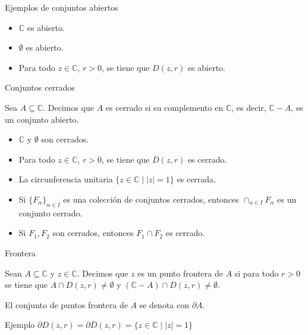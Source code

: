 \documentclass[spanish,presentation]{beamer}
\begin{document}
\begin{frame}[label=sec-1-3]{Ejemplos de conjuntos abiertos}
\begin{exampleblock}{}
\begin{itemize}
\item \(\mathbb{C}\) es abierto.
\item \(\emptyset\) es abierto.
\item Para todo \(z\in \mathbb{C}\), \(r>0\), se tiene que \(D(z,r)\)
      es abierto.
\end{itemize}
\end{exampleblock}
\end{frame}

\begin{frame}[label=sec-1-4]{Conjuntos cerrados}
\begin{definition}
Sea \(A\subseteq \mathbb{C}\). Decimos que \(A\) es cerrado si su
complemento en \(\mathbb{C}\), es decir, \(\mathbb{C}-A\), es un
conjunto abierto.
\end{definition}

\begin{exampleblock}{}
\begin{itemize}
\item \(\mathbb{C}\) y \(\emptyset\) son cerrados.
\item Para todo \(z\in \mathbb{C}\), \(r>0\), se tiene que \(\overline{D}(z,r)\)
      es cerrado.
\item La circunferencia unitaria \(\{z\in \mathbb{C}\mid |z|=1\}\) es cerrada.
\end{itemize}
\end{exampleblock}

\begin{theorem}
\begin{itemize}
\item Si \(\{F_{\alpha}\}_{\alpha\in I}\) es una colección de
conjuntos cerrados, entonces \(\cap_{\alpha\in I}F_{\alpha}\) es un
conjunto cerrado.
\item Si \(F_{1},F_{2}\) son cerrados, entonces \(F_{1}\cap F_{2}\) es
cerrado.
\end{itemize}
\end{theorem}
\end{frame}

\begin{frame}[label=sec-1-5]{Frontera}
\begin{definition}
Sean \(A\subseteq \mathbb{C}\) y \(z\in \mathbb{C}\). Decimos que \(z\) es
un \alert{punto frontera} de \(A\) si para todo \(r>0\) se tiene que
\(A\cap D(z,r)\not=\emptyset\) y \((\mathbb{C}-A)\cap
    D(z,r)\not=\emptyset\). 
\end{definition}

\begin{block}{}
El conjunto de puntos frontera de \(A\) se denota con \(\partial A\).
\end{block}

\begin{exampleblock}{Ejemplo}
\(\partial D(z,r)=\partial \overline{D}(z,r)=\{z\in \mathbb{C}\mid |z|=1\}\)
\end{exampleblock}
\end{frame}
\end{document}
